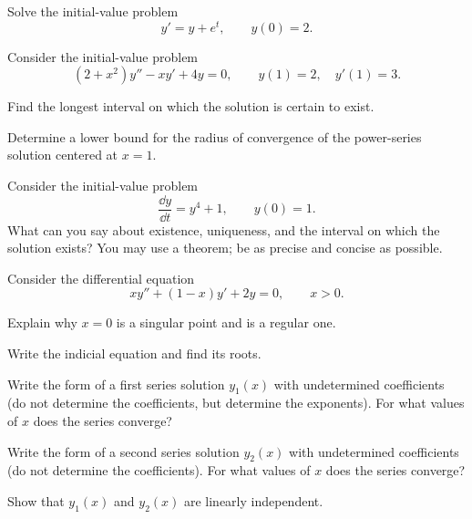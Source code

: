 \documentclass[11pt,oneside]{article}
\begin{document}
\begin{problem}
Solve the initial-value problem
\[y'=y+e^t,\qquad y(0)=2.\]
\end{problem}

\begin{problem}
Consider the initial-value problem
\[(2+x^2)y''-xy'+4y=0,\qquad y(1)=2,\quad y'(1)=3.\]
\begin{problemsubparts}
\item Find the longest interval on which the solution is certain to exist.
\item Determine a lower bound for the radius of convergence of the power-series solution centered at $x=1$.
\end{problemsubparts}
\end{problem}

\begin{problem}
Consider the initial-value problem
\[\frac{\dd y}{\dd t}=y^4+1,\qquad y(0)=1.\]
What can you say about existence, uniqueness, and the interval on which the solution exists? You may use a theorem; be as precise and concise as possible.
\end{problem}

\begin{problem}
Consider the differential equation
\[xy''+(1-x)y'+2y=0,\qquad x>0.\]
\begin{problemsubparts}
\item Explain why $x=0$ is a singular point and is a regular one.
\item Write the indicial equation and find its roots.
\item Write the form of a first series solution $y_1(x)$ with undetermined coefficients (do not determine the coefficients, but determine the exponents). For what values of $x$ does the series converge?
\item Write the form of a second series solution $y_2(x)$ with undetermined coefficients (do not determine the coefficients). For what values of $x$ does the series converge?
\item Show that $y_1(x)$ and $y_2(x)$ are linearly independent.
\end{problemsubparts}
\end{problem}
\end{document}
